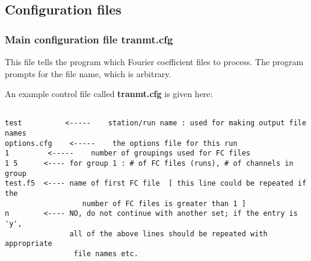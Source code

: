 \subsection{Configuration files}

\subsubsection{Main configuration file tranmt.cfg} \label{tranmt_cfg}

This file tells the program which Fourier coefficient
files to process.
The program prompts for the file name, which is arbitrary.

An example control file called {\bf tranmt.cfg} is
given here:

\begin{verbatim}

test          <-----    station/run name : used for making output file names
options.cfg    <-----    the options file for this run
1         <-----    number of groupings used for FC files
1 5      <---- for group 1 : # of FC files (runs), # of channels in group
test.f5  <---- name of first FC file  [ this line could be repeated if the
                  number of FC files is greater than 1 ]
n        <---- NO, do not continue with another set; if the entry is 'y',
               all of the above lines should be repeated with appropriate
                file names etc.
\end{verbatim}
\normalsize

